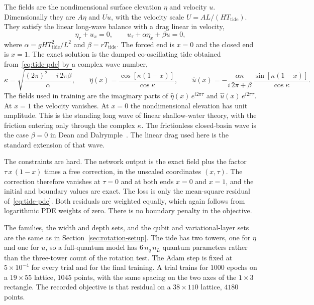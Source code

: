 \documentclass[11pt]{article}
\begin{document}
The fields are the nondimensional surface elevation \(\eta\) and velocity \(u\). Dimensionally they are \(A\eta\) and \(U u\), with the velocity scale \(U=AL/(HT_{\mathrm{tide}})\). They satisfy the linear long-wave balance with a drag linear in velocity,
\begin{equation}
\label{eq:tide-pde}
\eta_{\tau}+u_{x}=0,
\qquad
u_{\tau}+\alpha\eta_{x}+\beta u=0,
\end{equation}
where \(\alpha=gHT_{\mathrm{tide}}^{2}/L^{2}\) and \(\beta=rT_{\mathrm{tide}}\). The forced end is \(x=0\) and the closed end is \(x=1\). The exact solution is the damped co-oscillating tide obtained from~\eqref{eq:tide-pde} by a complex wave number,
\begin{equation}
\label{eq:tide-exact}
\kappa=\sqrt{\frac{(2\pi)^{2}-i\,2\pi\beta}{\alpha}},
\qquad
\hat\eta(x)=\frac{\cos[\kappa(1-x)]}{\cos\kappa},
\qquad
\hat u(x)=-\frac{\alpha\kappa}{i\,2\pi+\beta}\,\frac{\sin[\kappa(1-x)]}{\cos\kappa}.
\end{equation}
The fields used in training are the imaginary parts of \(\hat\eta(x)\,e^{i 2\pi\tau}\) and \(\hat u(x)\,e^{i 2\pi\tau}\). At \(x=1\) the velocity vanishes. At \(x=0\) the nondimensional elevation has unit amplitude. This is the standing long wave of linear shallow-water theory, with the friction entering only through the complex \(\kappa\). The frictionless closed-basin wave is the case \(\beta=0\) in Dean and Dalrymple~\cite{dean1991}. The linear drag used here is the standard extension of that wave.

The constraints are hard. The network output is the exact field plus the factor \(\tau\,x\,(1-x)\) times a free correction, in the unscaled coordinates \((x,\tau)\). The correction therefore vanishes at \(\tau=0\) and at both ends \(x=0\) and \(x=1\), and the initial and boundary values are exact. The loss is only the mean-square residual of~\eqref{eq:tide-pde}. Both residuals are weighted equally, which again follows from logarithmic PDE weights of zero. There is no boundary penalty in the objective.

The families, the width and depth sets, and the qubit and variational-layer sets are the same as in Section~\ref{sec:rotation-setup}. The tide has two towers, one for \(\eta\) and one for \(u\), so a full-quantum model has \(6\,n_{q}\,n_{L}\) quantum parameters rather than the three-tower count of the rotation test. The Adam step is fixed at \(5\times 10^{-4}\) for every trial and for the final training. A trial trains for \(1000\) epochs on a \(19\times 55\) lattice, \(1045\) points, with the same spacing on the two axes of the \(1\times 3\) rectangle. The recorded objective is that residual on a \(38\times 110\) lattice, \(4180\) points.
\end{document}
